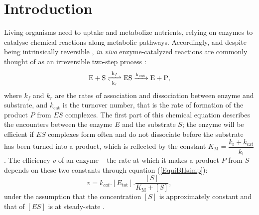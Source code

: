 \documentclass[nogrid,crop,final]{MBE2}%
\begin{document}

\maketitle

\section{{Introduction}\label{sec:Intro}}


Living organisms need to uptake and metabolize nutrients, relying on enzymes to catalyse chemical reactions along metabolic pathways. Accordingly, and despite being intrinsically reversible \citep{Haldane30,Klipp94}, \textit{in vivo} enzyme-catalyzed reactions are commonly thought of as an irreversible two-step process \citep{MichaelisMenten1913,Bar-Even11,Bar-Even15,Johnson11}:
\begin{equation}
\ce{ E + S <=>[k_{f}][k_{r}] ES ->[k_{cat}] E + P },
\label{chemMM}
\end{equation}
where $k_f$ and $k_r$ are the rates of association and dissociation between enzyme and substrate, and $k_\text{cat}$ is the turnover number, that is the rate of formation of the product $P$ from $ES$ complexes. The first part of this chemical equation describes the encounters between the enzyme $E$ and the substrate $S$; the enzyme will be efficient if $ES$ complexes form often and do not dissociate before the substrate has been turned into a product, which is reflected by the constant $K_\text{M}=\dfrac{k_\text{r}+k_\text{cat}}{k_\text{f}}$. The efficiency $v$ of an enzyme -- the rate at which it makes a product $P$ from $S$ -- depends on these two constants through equation (\ref{EquiBHsimp}):
\begin{equation}
v=k_{cat}.[E_\text{tot}].\frac{[S]}{K_\text{M}+[S]},
\label{EquiBHsimp}
\end{equation}
\noindent under the assumption that the concentration $[S]$ is approximately constant and that of $[ES]$ is at steady-state \citep{MichaelisMenten1913, Briggs25}.
 
\end{document}
